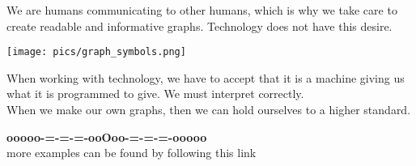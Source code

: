 \documentclass{ximera}
\begin{document}
We are humans communicating to other humans, which is why we take care to create readable and informative graphs. Technology does not have this desire.





\begin{image}
\texttt{[image: pics/graph\_symbols.png]}
\end{image}



When working with technology, we have to accept that it is a machine giving us what it is programmed to give.  We must interpret correctly. \\


When we make our own graphs, then we can hold ourselves to a higher standard.















\begin{center}
\textbf{\textcolor{green!50!black}{ooooo-=-=-=-ooOoo-=-=-=-ooooo}} \\

more examples can be found by following this link\\ 

\end{center}
\end{document}
